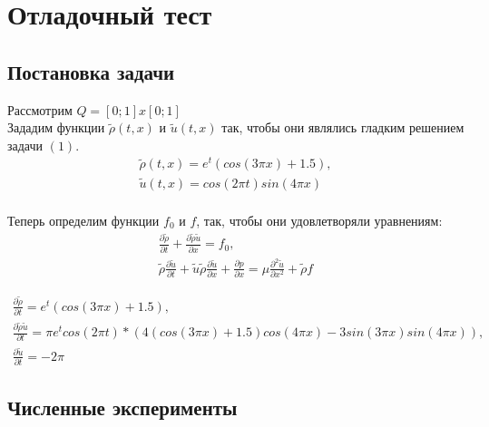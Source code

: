 \section{Отладочный тест}
\subsection{Постановка задачи}

Рассмотрим $Q = [0;1] x [0;1]$\\

Зададим функции $\tilde{\rho}(t, x)$ и $\tilde{u}(t, x)$ так, чтобы они являлись гладким решением задачи $(1)$.
\begin{equation}
	\begin{array}{lc}
		\tilde{\rho}(t, x) = e^t(cos(3\pi x) + 1.5),\\
		\tilde{u}(t, x) = cos(2\pi t)sin(4\pi x)\\
	\end{array}
\end{equation}

Теперь определим функции $f_0$ и $f$, так, чтобы они удовлетворяли уравнениям:
\begin{equation}
	\begin{array}{lc}
		\frac{\partial\tilde{\rho}}{\partial t} + \frac{\partial\tilde{\rho}\tilde{u}}{\partial x} = f_0,\\
		\tilde{\rho}\frac{\partial\tilde{u}}{\partial t} + \tilde{u}\tilde{\rho}\frac{\partial\tilde{u}}{\partial x} + \frac{\partial p}{\partial x} = \mu\frac{\partial^2\tilde{u}}{\partial x^2} + \tilde{\rho}f
	\end{array}
\end{equation}

\begin{equation}
	\begin{array}{lc}
		\frac{\partial\tilde{\rho}}{\partial t}  = e^t(cos(3\pi x) + 1.5), \\
		\frac{\partial\tilde{\rho}\tilde{u}}{\partial t}  = \pi e^t cos(2\pi t) * (4(cos(3\pi x) + 1.5) cos (4\pi x) - 3sin(3\pi x )sin(4\pi x)), \\
		
		\frac{\partial\tilde{u}}{\partial t} = -2\pi
	\end{array}
\end{equation}

\subsection{Численные эксперименты}

